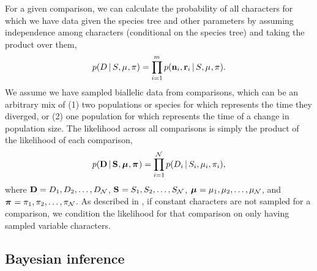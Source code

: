 \begin{linenomath}
For a given comparison, we can calculate the probability of all \nloci{}
characters for which we have data given the species tree and other parameters
by assuming independence among characters (conditional on the species tree) and
taking the product over them,
\begin{equation}
    \pr(\comparisondata \given \sptree, \murate, \gfreq)
    =
    \prod_{i=1}^{\nloci}
    \pr(\leafallelecounts[i], \leafredallelecounts[i] \given \sptree, \murate, \gfreq).
    \label{eq:comparisonlikelihood}
\end{equation}
We assume we have sampled biallelic data from \ncomparisons{} comparisons,
which can be an arbitrary mix of
(1) two populations or species for which \comparisonetime represents
the time they diverged, or
(2) one population for which \comparisonetime represents the time
of a change in population size.
The likelihood across all \ncomparisons{} comparisons is simply the product of the
likelihood of each comparison,
\begin{equation}
    \pr(
    \alldata
    \given
    \sptrees,
    \murates,
    \gfreqs)
    =
    \prod_{i=1}^{\ncomparisons}
    \pr(\comparisondata[i] \given \sptree[i], \murate[i], \gfreq[i]),
    \label{eq:collectionlikelihood}
\end{equation}
where
$\alldata = \comparisondata[1], \comparisondata[2], \ldots, \comparisondata[\ncomparisons]$,
$\sptrees = \sptree[1], \sptree[2], \ldots, \sptree[\ncomparisons]$,
$\murates = \murate[1], \murate[2], \ldots, \murate[\ncomparisons]$,
and
$\gfreqs = \gfreq[1], \gfreq[2], \ldots, \gfreq[\ncomparisons]$.
As described in \citet{Oaks2018ecoevolity},
if constant characters are not sampled for a comparison, we condition the likelihood
for that comparison on only having sampled variable characters.
\end{linenomath}


\subsection{Bayesian inference}

